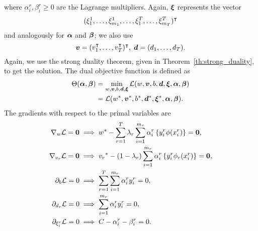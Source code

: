 where $\alpha_i^r, \beta_i^r \geq 0$ are the Lagrange multipliers. Again, $\bm{\xi}$ represents the vector $$(\xi_1^1, \ldots, \xi_{m_1}^1, \ldots, \xi_1^T, \ldots, \xi_{m_T}^T)^\intercal$$ and analogously for $\bm{\alpha}$ and $\bm{\beta}$; we also use 
$$ \bm{v} = (v_1^\intercal, \ldots, v_T^\intercal)^\intercal,\; \bm{d} = (d_1, \ldots, d_T).$$
Again, we use the strong duality theorem, given in Theorem~\ref{th:strong_duality}, to get the solution.
The dual objective function is defined as 
\begin{equation}\nonumber
    \begin{aligned}
         \Theta(\bm{\alpha}, \bm{\beta}) &=  \min_{{w}, \bm{v}, b, \bm{d}, \bm{\xi}} \mathcal{L}({w}, \bm{v}, b, \bm{d}, \bm{\xi}, \bm{\alpha}, \bm{\beta}) \\
         &= \mathcal{L}({{w}}^*, {\bm{v}}^*, {b}^*, {\bm{d}}^*, {\bm{\xi}}^*, \bm{\alpha}, \bm{\beta}) .
    \end{aligned}    
\end{equation}
The gradients with respect to the primal variables are
\begin{align}
    \grad_{{w}} \lagr  = \fv{0}  &\implies \optim{{w}} - \sum_{r= 1}^\ntasks \lambda_r \sum_{i=1}^{m_r} {\alpha_i^r} \left\lbrace y_i^r \phi(x_i^r) \right\rbrace = \fv{0} , \label{eq:common_repr_conv} \\
    \grad_{{v}_r} \lagr  = \fv{0} &\implies \optim{{v}_r} - (1 - \lambda_r) \sum_{i=1}^{m_r} {\alpha_i^r} \left\lbrace y_i^r \phi_r(x_i^r) \right\rbrace = \fv{0} , \label{eq:specific_repr_conv} \\
    \partial_{b} \lagr  = 0  &\implies \sum_{r= 1}^T \sum_{i=1}^{m_r} {\alpha_i^r} y_i^r = 0 , \label{eq:specific_eqconstr_conv}  \\
    \partial_{{d}_r} \lagr  = 0 &\implies \sum_{i=1}^{m_r} {\alpha_i^r} y_i^r = 0 , \label{eq:common_eqconstr_conv} \\
    \partial_{\xi_i^r} \lagr  = 0 &\implies C - {\alpha_i^r} - {\beta_i^r} = 0 . \label{eq:xi_feas_conv}
\end{align}
